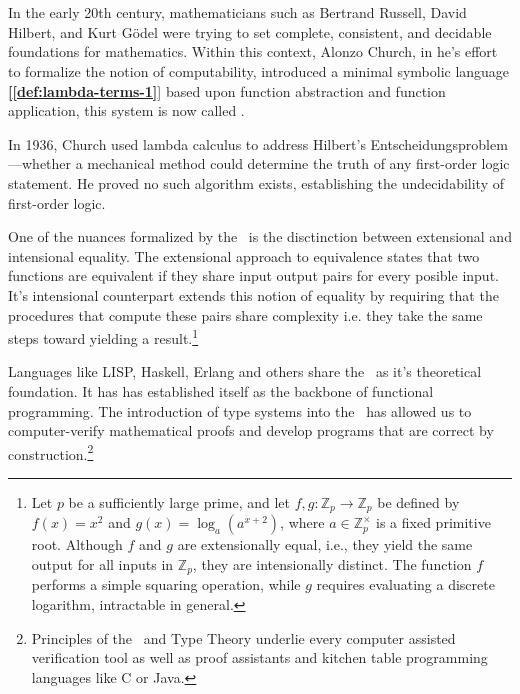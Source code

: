 \documentclass[12pt]{book}
\newcommand{\myref}[1]{\textcolor{refcolor}{\textbf{[\hyperref[#1]{\ref*{#1}}}]}}
\begin{document}

\chapter{\lCalc}

In the early 20th century, mathematicians such as Bertrand Russell, David Hilbert, and Kurt Gödel were trying to set complete, consistent, and decidable foundations for mathematics. Within this context, Alonzo Church, in he's effort to formalize the notion of  computability, introduced a minimal symbolic language \myref{def:lambda-terms-1} based upon function abstraction and function application, this system is now called \lcalc.

In 1936, Church used lambda calculus to address Hilbert’s Entscheidungsproblem—whether a mechanical method could determine the truth of any first-order logic statement. He proved no such algorithm exists, establishing the undecidability of first-order logic.

One of the nuances formalized by the \lcalc \ is the disctinction between extensional and intensional equality. The extensional approach to equivalence states that two functions are equivalent if they share input output pairs for every posible input. It's intensional counterpart extends this notion of equality by requiring that the procedures that compute these pairs share complexity i.e. they take the same steps toward yielding a result.\footnote{
  Let \( p \) be a sufficiently large prime, and let \( f, g : \mathbb{Z}_p \to \mathbb{Z}_p \) be defined by \( f(x) = x^2 \) and \( g(x) = \log_a(a^{x+2}) \), where \( a \in \mathbb{Z}_p^\times \) is a fixed primitive root. Although \( f \) and \( g \) are extensionally equal, i.e., they yield the same output for all inputs in \( \mathbb{Z}_p \), they are intensionally distinct. The function \( f \) performs a simple squaring operation, while \( g \) requires evaluating a discrete logarithm, intractable in general. 
}

Languages like LISP, Haskell, Erlang and others share the \lcalc \ as it's theoretical foundation. It has has established itself as the backbone of functional programming. The introduction of type systems into the \lcalc \ has allowed us to computer-verify mathematical proofs and develop programs that are correct by construction.\footnote{Principles of the \lcalc \ and Type Theory underlie every computer assisted verification tool as well as proof assistants and kitchen table programming languages like C or Java.}
\end{document}
